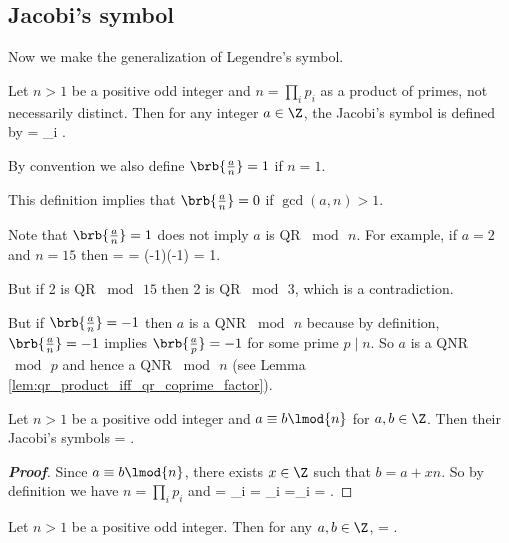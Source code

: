 \subsection{Jacobi's symbol}

Now we make the generalization of Legendre's symbol.

\begin{definition}
Let $n>1$ be a positive odd integer and $n = \prod_i p_i$ as a product of primes, not necessarily distinct. Then for any integer $a\in \Z$, the Jacobi's symbol is defined by
\be
{} = \prod_i .
\ee

By convention we also define $\brb{\frac an} =1$ if $n=1$.
\end{definition}

\begin{remark}
This definition implies that $\brb{\frac an} = 0$ if $\gcd(a,n) >1$.

Note that $\brb{\frac an} = 1$ does not imply $a$ is QR $\bmod\, n$. For example, if $a=2$ and $n=15$ then
\be
{} =  = (-1)(-1) = 1.
\ee

But if 2 is QR $\bmod\, 15$ then 2 is QR $\bmod\,3$, which is a contradiction.

But if $\brb{\frac an} = -1$ then $a$ is a QNR $\bmod\, n$ because by definition, $\brb{\frac an} =-1$ implies $\brb{\frac ap} = -1$ for some prime $p\mid n$. So $a$ is a QNR $\bmod\, p$ and hence a QNR $\bmod \, n$ (see Lemma \ref{lem:qr_product_iff_qr_coprime_factor}).
\end{remark}

\begin{proposition}
Let $n>1$ be a positive odd integer and $a\equiv b\lmod{n}$ for $a,b\in \Z$. Then their Jacobi's symbols
\be
{} = .
\ee
\end{proposition}

\begin{proof}[\bf Proof]
Since $a\equiv b\lmod{n}$, there exists $x\in \Z$ such that $b = a+ xn$. So by definition we have $n = \prod_i p_i$ and
\be
{} = \prod_i = \prod_i =\prod_i = .
\ee
\end{proof}

\begin{proposition}\label{pro:jacobi_symbol_product}
Let $n>1$ be a positive odd integer. Then for any $a,b\in \Z$,
\be
{} = .
\ee
\end{proposition}


